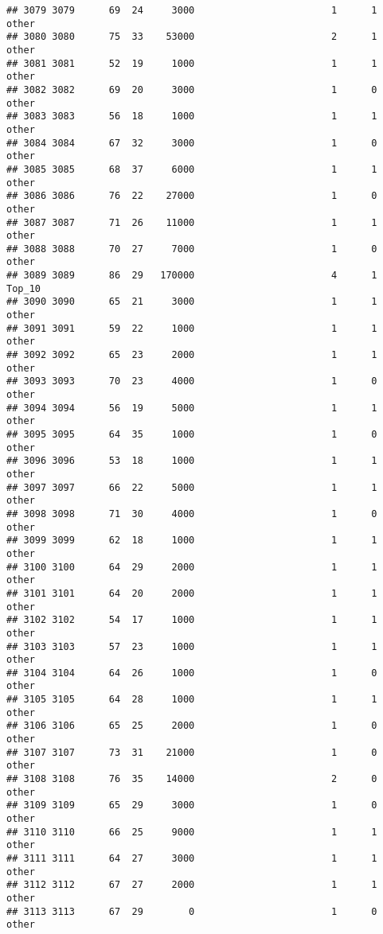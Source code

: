 \documentclass[
]{article}
\begin{document}
\begin{verbatim}
## 3079 3079      69  24     3000                        1      1    other
## 3080 3080      75  33    53000                        2      1    other
## 3081 3081      52  19     1000                        1      1    other
## 3082 3082      69  20     3000                        1      0    other
## 3083 3083      56  18     1000                        1      1    other
## 3084 3084      67  32     3000                        1      0    other
## 3085 3085      68  37     6000                        1      1    other
## 3086 3086      76  22    27000                        1      0    other
## 3087 3087      71  26    11000                        1      1    other
## 3088 3088      70  27     7000                        1      0    other
## 3089 3089      86  29   170000                        4      1   Top_10
## 3090 3090      65  21     3000                        1      1    other
## 3091 3091      59  22     1000                        1      1    other
## 3092 3092      65  23     2000                        1      1    other
## 3093 3093      70  23     4000                        1      0    other
## 3094 3094      56  19     5000                        1      1    other
## 3095 3095      64  35     1000                        1      0    other
## 3096 3096      53  18     1000                        1      1    other
## 3097 3097      66  22     5000                        1      1    other
## 3098 3098      71  30     4000                        1      0    other
## 3099 3099      62  18     1000                        1      1    other
## 3100 3100      64  29     2000                        1      1    other
## 3101 3101      64  20     2000                        1      1    other
## 3102 3102      54  17     1000                        1      1    other
## 3103 3103      57  23     1000                        1      1    other
## 3104 3104      64  26     1000                        1      0    other
## 3105 3105      64  28     1000                        1      1    other
## 3106 3106      65  25     2000                        1      0    other
## 3107 3107      73  31    21000                        1      0    other
## 3108 3108      76  35    14000                        2      0    other
## 3109 3109      65  29     3000                        1      0    other
## 3110 3110      66  25     9000                        1      1    other
## 3111 3111      64  27     3000                        1      1    other
## 3112 3112      67  27     2000                        1      1    other
## 3113 3113      67  29        0                        1      0    other

\end{verbatim}
\end{document}
